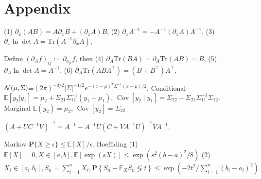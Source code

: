 \section{Appendix}
\begin{scriptsize}
    (1) $\partial_x (AB) = A\partial_x B+(\partial_x A)B$, 
    (2) $\partial_x A^{-1} = -A^{-1}(\partial_x A)A^{-1}$, 
    (3) $\partial_x\ln\det A = \mathrm{Tr}\left(A^{-1}\partial_x A\right)$,
    
    Define $(\partial_A f)_{ij}:=\partial_{a_{ji}} f$, then
    (4) $\partial_A\mathrm{Tr}(BA) = \partial_A\mathrm{Tr}(AB) = B$,
    (5) $\partial_A\ln\det A=A^{-1}$,
    (6) $\partial_A\mathrm{Tr}(ABA^{\top}) = (B+B^{\top})A^{\top}$,
    
    $\mathcal{N}(\mu,\Sigma)$=$(2\pi)^{-d/2}|\Sigma|^{-1/2}e^{-(x-\mu)^T \Sigma^{-1} (x-\mu)/2}$, 
    Conditional $\mathbb{E} [y_2 | y_1] = \mu_2+\Sigma_{21}\Sigma_{11}^{-1} (y_1-\mu_1)$, $\operatorname{Cov}[y_2\mid y_1] = \Sigma_{22} - \Sigma_{21}\Sigma_{11}^{-1}\Sigma_{12}$. 
    Marginal $\mathbb{E} (y_2 ) = \mu_2$, $\operatorname{Cov}[y_2] = \Sigma_{22}$
    
    $(A + U C^{-1} V)^{-1} = A^{-1} - A^{-1}U(C+VA^{-1}U)^{-1}V A^{-1}$.

    Markov $\mathbf{P}\{X \geq \epsilon\} \leq {\mathbb{E}[X]}/{\epsilon}$. Hoeffiding (1) $\mathbb{E}[X] = 0, X\in[a,b], \mathbb{E}[\exp (s X)] \leq \exp \left(s^{2}(b-a)^{2} / 8\right)$ (2) $X_i \in [a_i. b_i], S_{n}=\sum_{i=1}^{n} X_{i},\mathbf{P}\left\{S_{n}-\mathbb{E}_{X} S_{n} \lessgtr  t\right\} \leq \exp \left(-{2 t^{2}} / {\sum_{i=1}^{n}\left(b_{i}-a_{i}\right)^{2}}\right)$
\end{scriptsize}




